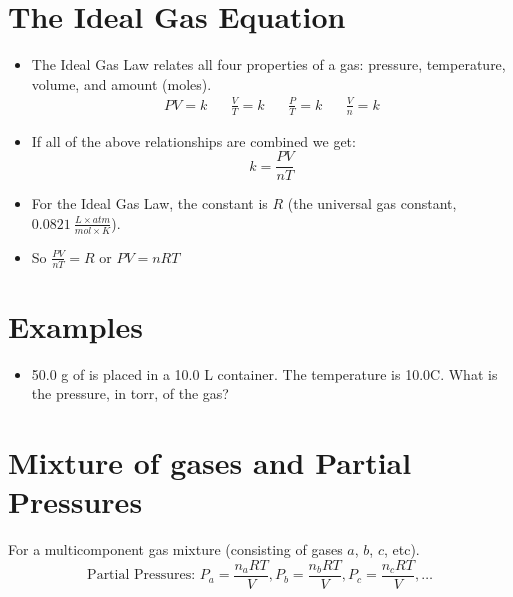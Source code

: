 \documentclass[
	chapter=5,
	title={Gases},
	showanswers=true,
]{chem122notes}
\begin{document}
\section{The Ideal Gas Equation}\label{sec:the-ideal-gas-equation}
\begin{itemize}
	\item The Ideal Gas Law relates all four properties of a gas: pressure, temperature, volume, and amount (moles).
	\begin{equation*}
	\begin{aligned}
		PV = k \ \ &\ \  \frac{V}{T} = k \ \ &\ \  \frac{P}{T} = k \ \ &\ \  \frac{V}{n} = k
	\end{aligned}
	\end{equation*}
	\item If all of the above relationships are combined we get:
	\begin{equation}
		k = \frac{PV}{nT}
		\label{eq:ideal-gas-equation}
	\end{equation}
	\item For the Ideal Gas Law, the constant is $R$ (the universal gas constant, $0.0821\ \frac{L\times atm}{mol\times K}$).
	\item So $\frac{PV}{nT} = R$ or $PV = nRT$
\end{itemize}

\section{Examples}\label{sec:examples-3}
\begin{itemize}
	\item 50.0 g of  is placed in a 10.0 L container. The temperature is 10.0\textdegree{}C. What is the pressure, in torr, of the gas?
\end{itemize}

\section{Mixture of gases and Partial Pressures}\label{sec:mixture-of-gases-and-partial-pressures}
For a multicomponent gas mixture (consisting of gases $a$, $b$, $c$, etc).
\[ \mbox{Partial Pressures: } P_{a} = \frac{n_{a}RT}{V}, P_{b} = \frac{n_{b}RT}{V}, P_{c} = \frac{n_{c}RT}{V}, \dots \]
\end{document}

